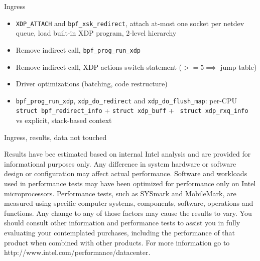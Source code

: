 \documentclass[aspectratio=169, xcolor=table]{beamer}
\begin{document}
  \begin{frame}{Ingress}
      \begin{itemize}
        \item {\tt XDP\_ATTACH} and {\tt bpf\_xsk\_redirect}, attach
          at-most one socket per netdev queue, load built-in XDP
          program, 2-level hierarchy
        \item Remove indirect call, {\tt bpf\_prog\_run\_xdp}
        \item Remove indirect call, XDP actions switch-statement ($>=5
          \implies$ jump table)
        \item Driver optimizations (batching, code restructure)
        \item {\tt bpf\_prog\_run\_xdp}, {\tt xdp\_do\_redirect} and
          {\tt xdp\_do\_flush\_map}: per-CPU {\tt struct
            bpf\_redirect\_info} + {\tt struct xdp\_buff} + {\tt
            struct xdp\_rxq\_info} vs explicit, stack-based context
      \end{itemize}
  \end{frame}

  {%
  \begin{frame}{Ingress, results, data not touched}
  \fontsize{3pt}{2pt}\selectfont
    \begin{center}\end{center}
  Results have bee estimated based on internal Intel analysis and are
  provided for informational purposes only. Any difference in system
  hardware or software design or configuration may affect actual
  performance. Software and workloads used in performance tests may
  have been optimized for performance only on Intel
  microprocessors. Performance tests, such as SYSmark and MobileMark,
  are measured using specific computer systems, components, software,
  operations and functions. Any change to any of those factors may
  cause the results to vary. You should consult other information and
  performance tests to assist you in fully evaluating your
  contemplated purchases, including the performance of that product
  when combined with other products. For more information go to
  http://www.intel.com/performance/datacenter.  
  \end{frame}
  }
\end{document}
